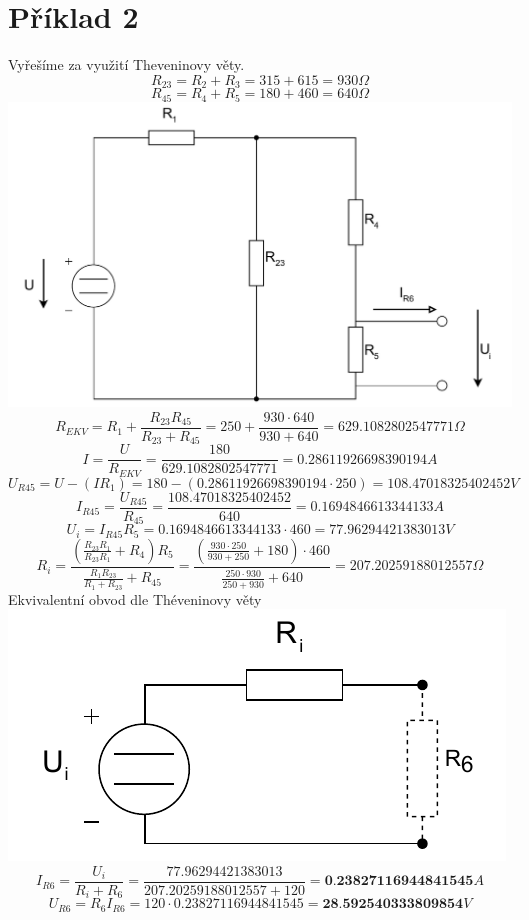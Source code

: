 \section{Příklad 2}
Vyřešíme za využití Theveninovy věty.\\
\[
  R_{23} = R_{2} + R_{3} = 315 + 615 = 930 \Omega
\]
\[
  R_{45} = R_4 + R_5 = 180 + 460 = 640 \Omega
\]
\includegraphics[scale=0.5,keepaspectratio]{fig/Pr2_1.pdf}
\[
  R_{EKV} = R_1 + \displaystyle\frac{R_{23}R_{45}}{R_{23}+R_{45}}
  = 250 + \displaystyle\frac{930 \cdot 640}{930 + 640}
  = 629.1082802547771 \Omega
\]
\[
  I = \displaystyle\frac{U}{R_{EKV}}
  = \displaystyle\frac{180}{629.1082802547771}
  = 0.28611926698390194A
\]
\[
  U_{R45} = U - (I R_1)
  = 180 - (0.28611926698390194\cdot 250)
  = 108.47018325402452 V
\]
\[
  I_{R45} = \displaystyle\frac{U_{R45}}{R_{45}}
  = \displaystyle\frac{108.47018325402452}{640}
  = 0.1694846613344133 A
\]
\[
  U_i = I_{R45} R_5
  = 0.1694846613344133 \cdot 460
  = 77.96294421383013 V
\]
\[
  R_i = \displaystyle\frac{(\displaystyle\frac{R_{23}R_{1}}{R_{23}R_1}+R_4)R_5}{
    \displaystyle\frac{R_1 R_{23}}{R_1 + R_{23}}+R_{45}
  }
  = \displaystyle\frac{(\displaystyle\frac{930\cdot 250}{930+250}+180)\cdot 460}{
    \displaystyle\frac{250 \cdot 930}{250 + 930}+640
  }
  = 207.20259188012557 \Omega
\]
Ekvivalentní obvod dle Théveninovy věty\\
\includegraphics[scale=1.0,keepaspectratio]{fig/Pr2_2.pdf}
\[
  I_{R6} = \displaystyle\frac{U_i}{R_i + R_6}
  = \displaystyle\frac{77.96294421383013}{207.20259188012557 + 120}
  = \textbf{0.23827116944841545}A
\]
\[
  U_{R6} = R_6 I_{R6}
  = 120 \cdot 0.23827116944841545 
  = \textbf{28.592540333809854}V
\]

